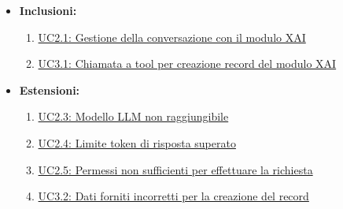 \begin{itemize}
\begin{enumerate}
                \item Le informazioni recuperate superano il limite massimo di token elaborabili dal modello (\hyperref[uc:uc2.4]{UC2.4}).
                \item L'utente non dispone dei permessi necessari per poter creare il record (\hyperref[uc:uc2.5]{UC2.5}).
                \item I dati forniti dall'utente sono incorretti per la creazione del record (\hyperref[uc:uc3.2]{UC3.2}).
            \end{enumerate}
        \item \textbf{Inclusioni:}
            \begin{enumerate}
                \item \hyperref[uc:uc2.1]{UC2.1: Gestione della conversazione con il modulo XAI}
                \item \hyperref[uc:uc3.1]{UC3.1: Chiamata a tool per creazione record del modulo XAI}
            \end{enumerate}
        \item \textbf{Estensioni:}
            \begin{enumerate}
                \item \hyperref[uc:uc2.3]{UC2.3: Modello LLM non raggiungibile}
                \item \hyperref[uc:uc2.4]{UC2.4: Limite token di risposta superato}
                \item \hyperref[uc:uc2.5]{UC2.5: Permessi non sufficienti per effettuare la richiesta}
                \item \hyperref[uc:uc3.2]{UC3.2: Dati forniti incorretti per la creazione del record}
            \end{enumerate}
    \end{itemize}

